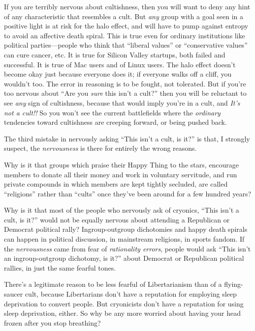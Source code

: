 {
 If you are terribly nervous about cultishness, then you will want
to deny any hint of any characteristic that resembles a cult. But
\textit{any} group with a goal seen in a positive light is at risk for
the halo effect, and will have to pump against entropy to avoid an
affective death spiral. This is true even for ordinary institutions
like political parties---people who think that
``liberal values'' or
``conservative values'' can cure
cancer, etc. It is true for Silicon Valley startups, both failed and
successful. It is true of Mac users and of Linux users. The halo effect
doesn't become okay just because everyone does it; if
everyone walks off a cliff, you wouldn't too. The error
in reasoning is to be fought, not tolerated. But if
you're too nervous about ``Are you
\textit{sure} this isn't a cult?''
then you will be reluctant to see \textit{any} sign of cultishness,
because that would imply you're in a cult, and
\textit{It's not a cult!!} So you won't
see the current battlefields where the \textit{ordinary} tendencies
toward cultishness are creeping forward, or being pushed back.}

{
 The third mistake in nervously asking ``This
isn't a cult, is it?'' is that, I
strongly suspect, the \textit{nervousness} is there for entirely the
wrong reasons.}

{
 Why is it that groups which praise their Happy Thing to the stars,
encourage members to donate all their money and work in voluntary
servitude, and run private compounds in which members are kept tightly
secluded, are called ``religions''
rather than ``cults'' once
they've been around for a few hundred years?}

{
 Why is it that most of the people who nervously ask of cryonics,
``This isn't a cult, is
it?'' would not be equally nervous about attending a
Republican or Democrat political rally? Ingroup-outgroup dichotomies
and happy death spirals can happen in political discussion, in
mainstream religions, in sports fandom. If the \textit{nervousness}
came from fear of \textit{rationality errors}, people would ask
``This isn't an ingroup-outgroup
dichotomy, is it?'' about Democrat or Republican
political rallies, in just the same fearful tones.}

{
 There's a legitimate reason to be less fearful of
Libertarianism than of a flying-saucer cult, because Libertarians
don't have a reputation for employing sleep deprivation
to convert people. But cryonicists don't have a
reputation for using sleep deprivation, either. So why be any more
worried about having your head frozen after you stop breathing?}

